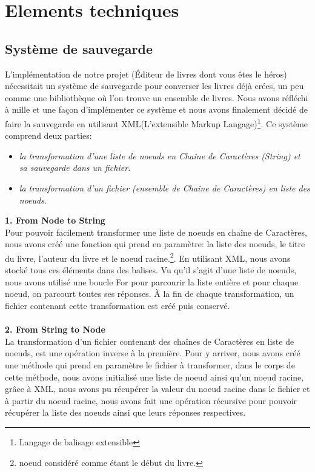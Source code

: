 \documentclass[12pt]{article}
\begin{document}
	\newpage
	\section{Elements techniques}
	\subsection{Système de sauvegarde}
	L'implémentation de notre projet (Éditeur de livres dont vous êtes le héros) nécessitait un système de sauvegarde pour converser les livres déjà crées, un peu comme une bibliothèque où l'on trouve un ensemble de livres. Nous avons réfléchi à mille et une façon d'implémenter ce système  et nous avons finalement décidé de  faire la sauvegarde en utilisant XML(L'extensible Markup Langage)\footnote{Langage de balisage extensible}. Ce système comprend deux parties:
	\begin{itemize}
		\item \textit{la transformation d'une liste de noeuds en Chaîne de Caractères (String) et sa sauvegarde dans un fichier.}
		\item \textit{la transformation d'un fichier (ensemble de Chaîne de Caractères) en liste des noeuds}.\\
	\end{itemize}
    \textbf{1. From Node to String}\\
    Pour pouvoir facilement transformer une liste de noeuds en chaîne de Caractères, nous avons créé une fonction qui prend en paramètre: la liste des noeuds, le titre du livre, l'auteur du livre et le noeud racine.\footnote{noeud considéré comme étant le début du livre. }. En utilisant XML, nous avons stocké tous ces éléments dans des balises. Vu qu'il s'agit d'une liste de noeuds, nous avons utilisé une boucle For pour parcourir la liste entière et pour chaque noeud, on parcourt toutes ses réponses. À la fin de chaque transformation, un fichier contenant cette transformation est créé puis conservé. \\\\
    \textbf{2. From String to Node}\\
	La transformation d'un fichier contenant des chaînes de Caractères en liste de noeuds, est une opération inverse à la première. Pour y arriver, nous avons créé une méthode qui prend en paramètre le fichier à transformer, dans le corps de cette méthode, nous avons initialisé une liste de noeud ainsi qu'un noeud racine, grâce à XML, nous avons pu récupérer la valeur du noeud racine dans le fichier et à partir du noeud racine, nous avons fait une opération récursive pour pouvoir récupérer la liste des noeuds ainsi que leurs réponses respectives.
\end{document}
